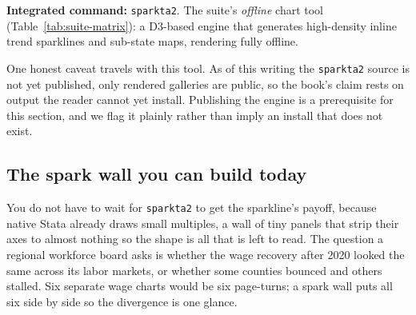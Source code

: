 \documentclass[
    a4paper,
    fontsize=10pt,
    twoside=true,
    numbers=noenddot,
]{kaobook}
\begin{document}
\begin{kaobox}[frametitle=Package Integration: \texttt{sparkta2}]
\textbf{Integrated command:} \texttt{sparkta2}. The suite's \emph{offline} chart tool (Table~\ref{tab:suite-matrix}): a D3-based engine that generates high-density inline trend sparklines and sub-state maps, rendering fully offline. %
\end{kaobox}

One honest caveat travels with this tool. As of this writing the \texttt{sparkta2} source is not yet published, only rendered galleries are public, so the book's claim rests on output the reader cannot yet install. Publishing the engine is a prerequisite for this section, and we flag it plainly rather than imply an install that does not exist.

\subsection{The spark wall you can build today}\label{sec:sparkwall}
You do not have to wait for \texttt{sparkta2} to get the sparkline's payoff, because native Stata already draws small multiples, a wall of tiny panels that strip their axes to almost nothing so the shape is all that is left to read. The question a regional workforce board asks is whether the wage recovery after 2020 looked the same across its labor markets, or whether some counties bounced and others stalled. Six separate wage charts would be six page-turns; a spark wall puts all six side by side so the divergence is one glance.
\end{document}

